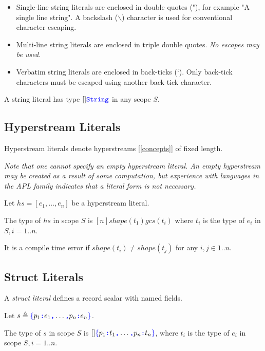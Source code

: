 \documentclass{article}
\begin{document}
\begin{itemize}
\item
Single-line string literals are enclosed in double quotes (\textsf{"}), for example \textsf{"}A single line string\textsf{"}. A backslash ($\backslash$) character is used for conventional character escaping.
\item Multi-line string literals are enclosed in triple double quotes.  {\em No escapes may be used.}
\item Verbatim string literals are enclosed in back-ticks (`). Only back-tick characters must be escaped using another back-tick character.
\end{itemize}

A string literal has type $[]\texttt{\color{blue} String}$ in any scope $S$.

\subsection{Hyperstream Literals}
\label{hyperstreamLiterals}

\HyperstreamLiteral

Hyperstream literals denote hyperstreams [\ref{concepts}] of fixed length. 

{\em Note that one cannot specify an empty hyperstream literal. An empty hyperstream may be created as a result of some computation, but experience with languages in the APL family indicates that a literal form is not necessary.}

Let $hs = [e_1, \ldots, e_n]$  be a hyperstream literal. 

The type of $hs$ in scope $S$  is $[n] shape(t_1)gcs(t_i)$ where $t_i$ is the type of $e_i$ in $S, i = 1..n$.

It is a compile time error if $shape(t_i) \ne shape(t_j)$ for any $i, j \in 1..n$.



\subsection{Struct Literals}
\label{structLiterals}

A {\em struct literal} defines a record scalar with named fields.

\StructLiteral{}
\Property{}

Let $s \triangleq \texttt{\color{blue} $\{$}{}p_1\texttt{\color{blue} :}{} e_1\texttt{\color{blue} ,}{} \ldots \texttt{\color{blue} ,}{} p_n\texttt{\color{blue} :}{} e_n\texttt{\color{blue} $\}$}$.

The type of $s$ in scope $S$ is $[]\texttt{\color{blue} $\{$}{}p_1\texttt{\color{blue} :}{} t_1\texttt{\color{blue} ,}{} \ldots \texttt{\color{blue} ,}{} p_n\texttt{\color{blue} :}{} t_n\texttt{\color{blue} $\}$}$, where $t_i$ is the type of $e_i$ in scope $S, i = 1..n$.
\end{document}
